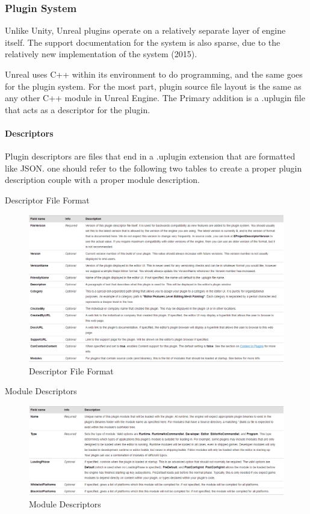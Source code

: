 \documentclass[12pt]{article}
\begin{document}
\subsubsection{Plugin System}\label{plugin-system}

Unlike Unity, Unreal plugins operate on a relatively separate layer of
engine itself. The support documentation for the system is also sparse,
due to the relatively new implementation of the system (2015).

Unreal uses C++ within its environment to do programming, and the same
goes for the plugin system. For the most part, plugin source file layout
is the same as any other C++ module in Unreal Engine. The Primary
addition is a .uplugin file that acts as a descriptor for the plugin.

\paragraph{Descriptors}\label{descriptors}

Plugin descriptors are files that end in a .uplugin extension that are
formatted like JSON. one should refer to the following two tables to
create a proper plugin description couple with a proper module
description.

Descriptor File Format \autocite{unreal:plugins}

\begin{figure}
\centering
\includegraphics{Pictures/Descriptor.PNG}
\caption{Descriptor File Format}
\end{figure}

Module Descriptors \autocite{unreal:plugins}

\begin{figure}
\centering
\includegraphics{Pictures/ModuleD.PNG}
\caption{Module Descriptors}
\end{figure}
\end{document}
